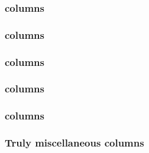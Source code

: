 \subsubsection{\miscSignifier\expMod{} columns \lispDone{}}    \label{hub: columns: miscellaneous: exp}      
\subsubsection{\miscSignifier\mmuMod{} columns \lispDone{}}    \label{hub: columns: miscellaneous: mmu}      
\subsubsection{\miscSignifier\mxpMod{} columns \lispDone{}}    \label{hub: columns: miscellaneous: mxp}      
\subsubsection{\miscSignifier\oobMod{} columns \lispDone{}}    \label{hub: columns: miscellaneous: oob}      
\subsubsection{\miscSignifier\stpMod{} columns \lispDone{}}    \label{hub: columns: miscellaneous: stp}      
\subsubsection{Truly miscellaneous columns \lispDone{}}        \label{hub: columns: miscellaneous: other}    
